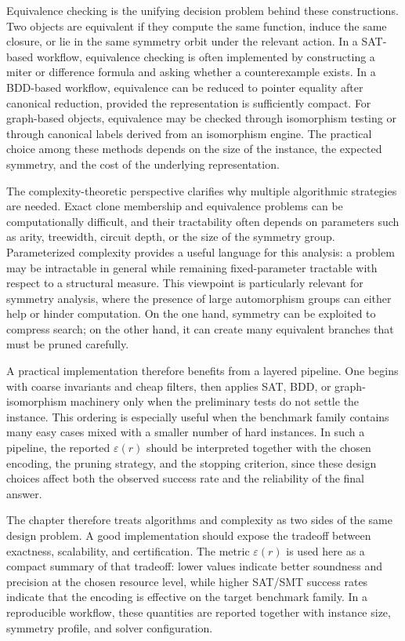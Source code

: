 Equivalence checking is the unifying decision problem behind these constructions. Two objects are equivalent if they compute the same function, induce the same closure, or lie in the same symmetry orbit under the relevant action. In a SAT-based workflow, equivalence checking is often implemented by constructing a miter or difference formula and asking whether a counterexample exists. In a BDD-based workflow, equivalence can be reduced to pointer equality after canonical reduction, provided the representation is sufficiently compact. For graph-based objects, equivalence may be checked through isomorphism testing or through canonical labels derived from an isomorphism engine. The practical choice among these methods depends on the size of the instance, the expected symmetry, and the cost of the underlying representation.

The complexity-theoretic perspective clarifies why multiple algorithmic strategies are needed. Exact clone membership and equivalence problems can be computationally difficult, and their tractability often depends on parameters such as arity, treewidth, circuit depth, or the size of the symmetry group. Parameterized complexity provides a useful language for this analysis: a problem may be intractable in general while remaining fixed-parameter tractable with respect to a structural measure. This viewpoint is particularly relevant for symmetry analysis, where the presence of large automorphism groups can either help or hinder computation. On the one hand, symmetry can be exploited to compress search; on the other hand, it can create many equivalent branches that must be pruned carefully.

A practical implementation therefore benefits from a layered pipeline. One begins with coarse invariants and cheap filters, then applies SAT, BDD, or graph-isomorphism machinery only when the preliminary tests do not settle the instance. This ordering is especially useful when the benchmark family contains many easy cases mixed with a smaller number of hard instances. In such a pipeline, the reported \(\varepsilon(r)\) should be interpreted together with the chosen encoding, the pruning strategy, and the stopping criterion, since these design choices affect both the observed success rate and the reliability of the final answer.

The chapter therefore treats algorithms and complexity as two sides of the same design problem. A good implementation should expose the tradeoff between exactness, scalability, and certification. The metric \(\varepsilon(r)\) is used here as a compact summary of that tradeoff: lower values indicate better soundness and precision at the chosen resource level, while higher SAT/SMT success rates indicate that the encoding is effective on the target benchmark family. In a reproducible workflow, these quantities are reported together with instance size, symmetry profile, and solver configuration.

